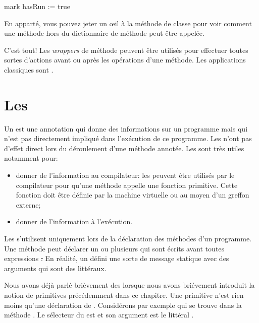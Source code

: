 \documentclass[a4paper,10pt,twoside]{book}
\begin{document}
{\begin{code}{}
mark
	hasRun := true
\end{code}
En apparté, vous pouvez jeter un \oe il à la méthode de classe
 pour voir comment
une méthode hors du dictionnaire de méthode peut être appelée.

C'est tout!
Les \emph{wrappers} de méthode peuvent être utilisés pour effectuer toutes sortes d'actions avant ou après les opérations d'une méthode.  Les applications classiques sont .

\section{Les \pragmas}

Un  est une annotation qui donne des informations sur un programme mais qui n'est pas directement impliqué dans l'exécution de ce programme. Les \pragmas n'ont pas d'effet direct lors du déroulement d'une méthode annotée.
Les \pragmas sont très utiles notamment pour:
\begin{itemize}
\item donner de l'information au compilateur: les  peuvent être utilisés par le compilateur pour qu'une méthode appelle une fonction primitive. Cette fonction doit être définie par la machine virtuelle ou au moyen d'un greffon externe;
\item donner de l'information à l'exécution.
\end{itemize}

Les \pragmas s'utilisent uniquement lors de la déclaration des méthodes d'un programme. Une méthode peut déclarer un ou plusieurs \pragmas qui sont écrits avant toutes expressions \st. En réalité, un \pragma défini une sorte de message statique avec des arguments qui sont des littéraux.

Nous avons déjà parlé brièvement des \pragmas lorsque nous avons briévement introduit la notion de primitives précédemment dans ce chapitre. Une primitive n'est rien moins qu'une déclaration de \pragma. 
Considérons par exemple  qui se trouve dans la méthode . Le sélecteur du \pragma est  et son argument est le littéral . 

}
\end{document}
